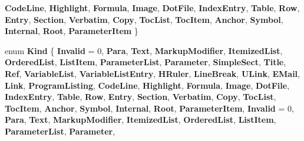 \begin{DoxyCompactItemize}
{\bfseries Code\+Line}, 
\newline
{\bfseries Highlight}, 
{\bfseries Formula}, 
{\bfseries Image}, 
{\bfseries Dot\+File}, 
\newline
{\bfseries Index\+Entry}, 
{\bfseries Table}, 
{\bfseries Row}, 
{\bfseries Entry}, 
\newline
{\bfseries Section}, 
{\bfseries Verbatim}, 
{\bfseries Copy}, 
{\bfseries Toc\+List}, 
\newline
{\bfseries Toc\+Item}, 
{\bfseries Anchor}, 
{\bfseries Symbol}, 
{\bfseries Internal}, 
\newline
{\bfseries Root}, 
{\bfseries Parameter\+Item}
 \}
\item 
\mbox{\label{class_i_doc_ada72396a5a52f43f68202112f1dd794f}} 
enum {\bfseries Kind} \{ \newline
{\bfseries Invalid} = 0, 
{\bfseries Para}, 
{\bfseries Text}, 
{\bfseries Markup\+Modifier}, 
\newline
{\bfseries Itemized\+List}, 
{\bfseries Ordered\+List}, 
{\bfseries List\+Item}, 
{\bfseries Parameter\+List}, 
\newline
{\bfseries Parameter}, 
{\bfseries Simple\+Sect}, 
{\bfseries Title}, 
{\bfseries Ref}, 
\newline
{\bfseries Variable\+List}, 
{\bfseries Variable\+List\+Entry}, 
{\bfseries H\+Ruler}, 
{\bfseries Line\+Break}, 
\newline
{\bfseries U\+Link}, 
{\bfseries E\+Mail}, 
{\bfseries Link}, 
{\bfseries Program\+Listing}, 
\newline
{\bfseries Code\+Line}, 
{\bfseries Highlight}, 
{\bfseries Formula}, 
{\bfseries Image}, 
\newline
{\bfseries Dot\+File}, 
{\bfseries Index\+Entry}, 
{\bfseries Table}, 
{\bfseries Row}, 
\newline
{\bfseries Entry}, 
{\bfseries Section}, 
{\bfseries Verbatim}, 
{\bfseries Copy}, 
\newline
{\bfseries Toc\+List}, 
{\bfseries Toc\+Item}, 
{\bfseries Anchor}, 
{\bfseries Symbol}, 
\newline
{\bfseries Internal}, 
{\bfseries Root}, 
{\bfseries Parameter\+Item}, 
{\bfseries Invalid} = 0, 
\newline
{\bfseries Para}, 
{\bfseries Text}, 
{\bfseries Markup\+Modifier}, 
{\bfseries Itemized\+List}, 
\newline
{\bfseries Ordered\+List}, 
{\bfseries List\+Item}, 
{\bfseries Parameter\+List}, 
{\bfseries Parameter}, 

\end{DoxyCompactItemize}
